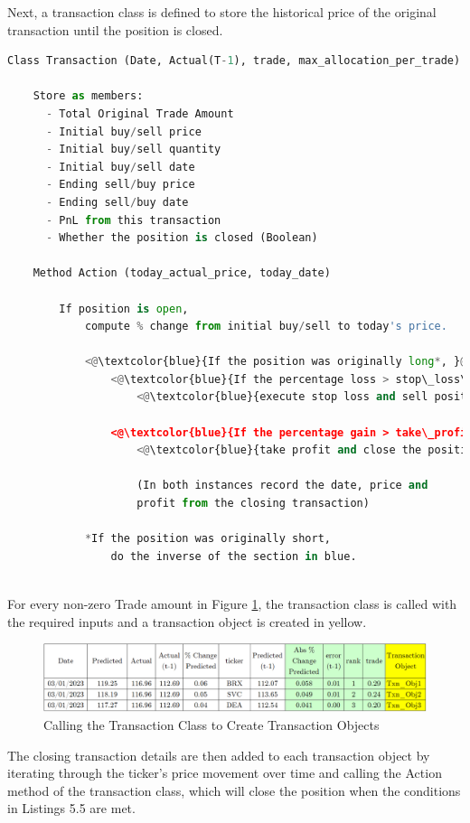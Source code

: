 \documentclass[a4paper,12pt]{report}
\numberwithin{equation}{section}
\theoremstyle{definition}
\begin{document}
Next, a transaction class is defined to store the historical price of the original transaction until the position is closed.

\begin{lstlisting}[language=Python, caption=Transaction Class Pseudocode, basicstyle=\footnotesize\ttfamily]
Class Transaction (Date, Actual(T-1), trade, max_allocation_per_trade): 

    Store as members:
      - Total Original Trade Amount
      - Initial buy/sell price
      - Initial buy/sell quantity
      - Initial buy/sell date
      - Ending sell/buy price
      - Ending sell/buy date
      - PnL from this transaction
      - Whether the position is closed (Boolean)

    Method Action (today_actual_price, today_date) 

        If position is open,
            compute % change from initial buy/sell to today's price.
        
            <@\textcolor{blue}{If the position was originally long*, }@> 
                <@\textcolor{blue}{If the percentage loss > stop\_loss\_percentage, }@> 
                    <@\textcolor{blue}{execute stop loss and sell position at today's price. }@>  

                <@\textcolor{blue}{If the percentage gain > take\_profit\_percentage, }@>
                    <@\textcolor{blue}{take profit and close the position at today's price. }@>      

                    (In both instances record the date, price and 
                    profit from the closing transaction) 

            *If the position was originally short, 
                do the inverse of the section in blue.
 
\end{lstlisting}
For every non-zero Trade amount in Figure \ref{fig:transaction_objects}, the transaction class is called with the required inputs and a transaction object is created in yellow.
\begin{figure}[H]
  \centerline{\includegraphics[width=17cm]{transaction_objects}}
  \caption{Calling the Transaction Class to Create Transaction Objects}
  \label{fig:transaction_objects}
\end{figure}
The closing transaction details are then added to each transaction object by iterating through the ticker's price movement over time and calling the Action method of the transaction class, which will close the position when the conditions in Listings 5.5 are met. 
\end{document}
